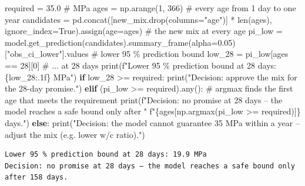 \documentclass[
  letterpaper,
  DIV=11,
  numbers=noendperiod]{scrreprt}
\newenvironment{Shaded}{\begin{snugshade}}{\end{snugshade}}
\newcommand{\BuiltInTok}[1]{\textcolor[rgb]{0.00,0.23,0.31}{#1}}
\newcommand{\CommentTok}[1]{\textcolor[rgb]{0.37,0.37,0.37}{#1}}
\newcommand{\ControlFlowTok}[1]{\textcolor[rgb]{0.00,0.23,0.31}{\textbf{#1}}}
\newcommand{\DecValTok}[1]{\textcolor[rgb]{0.68,0.00,0.00}{#1}}
\newcommand{\FloatTok}[1]{\textcolor[rgb]{0.68,0.00,0.00}{#1}}
\newcommand{\NormalTok}[1]{\textcolor[rgb]{0.00,0.23,0.31}{#1}}
\newcommand{\OperatorTok}[1]{\textcolor[rgb]{0.37,0.37,0.37}{#1}}
\newcommand{\SpecialCharTok}[1]{\textcolor[rgb]{0.37,0.37,0.37}{#1}}
\newcommand{\SpecialStringTok}[1]{\textcolor[rgb]{0.13,0.47,0.30}{#1}}
\newcommand{\StringTok}[1]{\textcolor[rgb]{0.13,0.47,0.30}{#1}}
\newcommand{\VariableTok}[1]{\textcolor[rgb]{0.07,0.07,0.07}{#1}}
\begin{document}
\begin{Shaded}
\begin{Highlighting}[]
\NormalTok{required }\OperatorTok{=} \FloatTok{35.0}                                            \CommentTok{\# MPa}
\NormalTok{ages }\OperatorTok{=}\NormalTok{ np.arange(}\DecValTok{1}\NormalTok{, }\DecValTok{366}\NormalTok{)                                   }\CommentTok{\# every age from 1 day to one year}
\NormalTok{candidates }\OperatorTok{=}\NormalTok{ pd.concat([new\_mix.drop(columns}\OperatorTok{=}\StringTok{"age"}\NormalTok{)] }\OperatorTok{*} \BuiltInTok{len}\NormalTok{(ages),}
\NormalTok{                       ignore\_index}\OperatorTok{=}\VariableTok{True}\NormalTok{).assign(age}\OperatorTok{=}\NormalTok{ages)  }\CommentTok{\# the new mix at every age}
\NormalTok{pi\_low }\OperatorTok{=}\NormalTok{ model.get\_prediction(candidates).summary\_frame(alpha}\OperatorTok{=}\FloatTok{0.05}\NormalTok{)[}\StringTok{"obs\_ci\_lower"}\NormalTok{].values  }\CommentTok{\# lower 95 \% prediction bound}
\NormalTok{low\_28 }\OperatorTok{=}\NormalTok{ pi\_low[ages }\OperatorTok{==} \DecValTok{28}\NormalTok{][}\DecValTok{0}\NormalTok{]                             }\CommentTok{\# ... at 28 days}
\BuiltInTok{print}\NormalTok{(}\SpecialStringTok{f"Lower 95 \% prediction bound at 28 days: }\SpecialCharTok{\{}\NormalTok{low\_28}\SpecialCharTok{:.1f\}}\SpecialStringTok{ MPa"}\NormalTok{)}
\ControlFlowTok{if}\NormalTok{ low\_28 }\OperatorTok{\textgreater{}=}\NormalTok{ required:}
    \BuiltInTok{print}\NormalTok{(}\StringTok{"Decision: approve the mix for the 28{-}day promise."}\NormalTok{)}
\ControlFlowTok{elif}\NormalTok{ (pi\_low }\OperatorTok{\textgreater{}=}\NormalTok{ required).}\BuiltInTok{any}\NormalTok{():                           }\CommentTok{\# argmax finds the first age that meets the requirement}
    \BuiltInTok{print}\NormalTok{(}\SpecialStringTok{f"Decision: no promise at 28 days – the model reaches a safe bound only after "}
          \SpecialStringTok{f"}\SpecialCharTok{\{}\NormalTok{ages[np.argmax(pi\_low }\OperatorTok{\textgreater{}=}\NormalTok{ required)]}\SpecialCharTok{\}}\SpecialStringTok{ days."}\NormalTok{)}
\ControlFlowTok{else}\NormalTok{:}
    \BuiltInTok{print}\NormalTok{(}\StringTok{"Decision: the model cannot guarantee 35 MPa within a year – adjust the mix (e.g. lower w/c ratio)."}\NormalTok{)}
\end{Highlighting}
\end{Shaded}

\begin{verbatim}
Lower 95 % prediction bound at 28 days: 19.9 MPa
Decision: no promise at 28 days – the model reaches a safe bound only after 158 days.
\end{verbatim}
\end{document}
